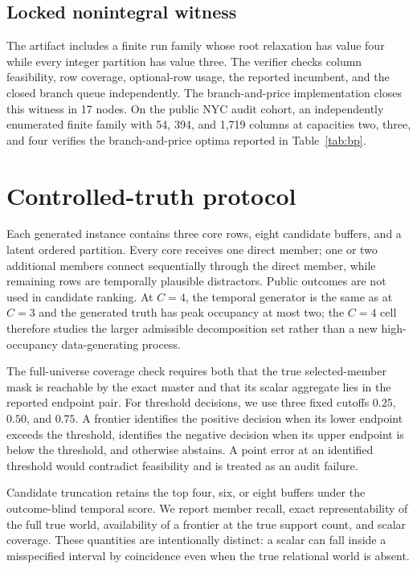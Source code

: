 \subsection{Locked nonintegral witness}

The artifact includes a finite run family whose root relaxation has value four
while every integer partition has value three.  The verifier checks column
feasibility, row coverage, optional-row usage, the reported incumbent, and the
closed branch queue independently.  The branch-and-price implementation closes
this witness in 17 nodes.  On the public NYC audit cohort, an independently
enumerated finite family with 54, 394, and 1,719 columns at capacities two,
three, and four verifies the branch-and-price optima reported in
Table~\ref{tab:bp}.

\section{Controlled-truth protocol}
\label{app:truth}

Each generated instance contains three core rows, eight candidate buffers, and
a latent ordered partition.  Every core receives one direct member; one or two
additional members connect sequentially through the direct member, while
remaining rows are temporally plausible distractors.  Public outcomes are not
used in candidate ranking.  At $C=4$, the temporal generator is the same as at
$C=3$ and the generated truth has peak occupancy at most two; the $C=4$ cell
therefore studies the larger admissible decomposition set rather than a new
high-occupancy data-generating process.

The full-universe coverage check requires both that the true selected-member
mask is reachable by the exact master and that its scalar aggregate lies in the
reported endpoint pair.  For threshold decisions, we use three fixed cutoffs
$0.25$, $0.50$, and $0.75$.  A frontier identifies the positive decision when
its lower endpoint exceeds the threshold, identifies the negative decision when
its upper endpoint is below the threshold, and otherwise abstains.  A point
error at an identified threshold would contradict feasibility and is treated as
an audit failure.

Candidate truncation retains the top four, six, or eight buffers under the
outcome-blind temporal score.  We report member recall, exact representability
of the full true world, availability of a frontier at the true support count,
and scalar coverage.  These quantities are intentionally distinct: a scalar
can fall inside a misspecified interval by coincidence even when the true
relational world is absent.
